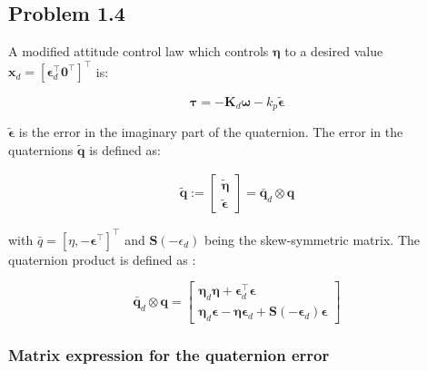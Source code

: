 \subsection*{Problem 1.4}
A modified attitude control law which controls $\boldsymbol{\eta}$ to a desired value $\mathbf{x}_d = [\boldsymbol{\epsilon}_d^\top \boldsymbol{0}^\top]^\top$ is:

\begin{equation}
    \boldsymbol{\tau} = - \mathbf{K}_d \boldsymbol{\omega} - k_p \tilde{\boldsymbol{\epsilon}}
    \label{eq:control_law_attitude2}
\end{equation}

$\tilde{\boldsymbol{\epsilon}}$ is the error in the imaginary part of the quaternion. The error in the quaternions $\tilde{\mathbf{q}}$ is defined as:

\begin{equation}
    \begin{aligned}
    \tilde{\boldsymbol{q}}
    :=
    \begin{bmatrix}
    \tilde{\boldsymbol{\eta}} \\
    \tilde{\boldsymbol{\epsilon}}
    \end{bmatrix}
    =
    \bar{\boldsymbol{q}}_d \otimes \boldsymbol{q}
    \label{eq:q_tilde}
    \end{aligned}
\end{equation}

with $\bar{q} = [\eta, -\boldsymbol{\epsilon}^\top] ^\top$ and $\mathbf{S}(-\epsilon_d)$ being the skew-symmetric matrix. The quaternion product is defined as :

\begin{equation}
    \bar{\boldsymbol{q}}_d \otimes \boldsymbol{q}
    =
    \begin{bmatrix}
    \boldsymbol{\eta}_{d} \boldsymbol{\eta} + \boldsymbol{\epsilon}_d^\top \boldsymbol{\epsilon} \\
    \boldsymbol{\eta}_d \boldsymbol{\epsilon} - \boldsymbol{\eta} \boldsymbol{\epsilon}_d + \mathbf{S}(-\boldsymbol{\epsilon}_d) \boldsymbol{\epsilon}
    \end{bmatrix}
    \label{eq:q_product}
\end{equation}

\subsubsection*{ Matrix expression for the quaternion error}

